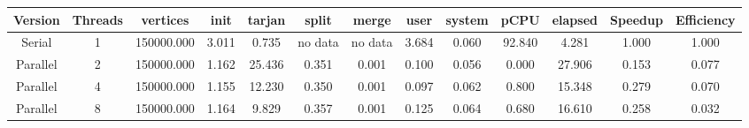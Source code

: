 \begin{tabular}{|c|c|c|c|c|c|c|c|c|c|c|c|c|}
\toprule
 Version &  Threads &   vertices &  init &  tarjan &   split &   merge &  user &  system &   pCPU &  elapsed &  Speedup &  Efficiency \\
\midrule
  Serial &        1 & 150000.000 & 3.011 &   0.735 & no data & no data & 3.684 &   0.060 & 92.840 &    4.281 &    1.000 &       1.000 \\
Parallel &        2 & 150000.000 & 1.162 &  25.436 &   0.351 &   0.001 & 0.100 &   0.056 &  0.000 &   27.906 &    0.153 &       0.077 \\
Parallel &        4 & 150000.000 & 1.155 &  12.230 &   0.350 &   0.001 & 0.097 &   0.062 &  0.800 &   15.348 &    0.279 &       0.070 \\
Parallel &        8 & 150000.000 & 1.164 &   9.829 &   0.357 &   0.001 & 0.125 &   0.064 &  0.680 &   16.610 &    0.258 &       0.032 \\
\bottomrule
\end{tabular}
